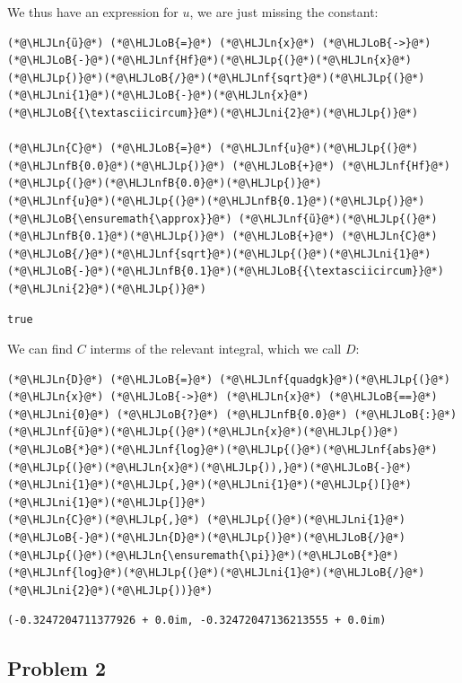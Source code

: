 \documentclass[12pt,a4paper]{article}
\newcommand{\HLJLn}[1]{#1}
\newcommand{\HLJLnf}[1]{\textcolor[RGB]{66,102,213}{#1}}
\newcommand{\HLJLnfB}[1]{\textcolor[RGB]{59,151,46}{#1}}
\newcommand{\HLJLni}[1]{\textcolor[RGB]{59,151,46}{#1}}
\newcommand{\HLJLoB}[1]{\textcolor[RGB]{102,102,102}{\textbf{#1}}}
\newcommand{\HLJLp}[1]{#1}
\begin{document}
We thus have an expression for $u$, we are just missing the constant:


\begin{lstlisting}
(*@\HLJLn{ũ}@*) (*@\HLJLoB{=}@*) (*@\HLJLn{x}@*) (*@\HLJLoB{->}@*) (*@\HLJLoB{-}@*)(*@\HLJLnf{Hf}@*)(*@\HLJLp{(}@*)(*@\HLJLn{x}@*)(*@\HLJLp{)}@*)(*@\HLJLoB{/}@*)(*@\HLJLnf{sqrt}@*)(*@\HLJLp{(}@*)(*@\HLJLni{1}@*)(*@\HLJLoB{-}@*)(*@\HLJLn{x}@*)(*@\HLJLoB{{\textasciicircum}}@*)(*@\HLJLni{2}@*)(*@\HLJLp{)}@*)

(*@\HLJLn{C}@*) (*@\HLJLoB{=}@*) (*@\HLJLnf{u}@*)(*@\HLJLp{(}@*)(*@\HLJLnfB{0.0}@*)(*@\HLJLp{)}@*) (*@\HLJLoB{+}@*) (*@\HLJLnf{Hf}@*)(*@\HLJLp{(}@*)(*@\HLJLnfB{0.0}@*)(*@\HLJLp{)}@*)
(*@\HLJLnf{u}@*)(*@\HLJLp{(}@*)(*@\HLJLnfB{0.1}@*)(*@\HLJLp{)}@*) (*@\HLJLoB{\ensuremath{\approx}}@*) (*@\HLJLnf{ũ}@*)(*@\HLJLp{(}@*)(*@\HLJLnfB{0.1}@*)(*@\HLJLp{)}@*) (*@\HLJLoB{+}@*) (*@\HLJLn{C}@*)(*@\HLJLoB{/}@*)(*@\HLJLnf{sqrt}@*)(*@\HLJLp{(}@*)(*@\HLJLni{1}@*)(*@\HLJLoB{-}@*)(*@\HLJLnfB{0.1}@*)(*@\HLJLoB{{\textasciicircum}}@*)(*@\HLJLni{2}@*)(*@\HLJLp{)}@*)
\end{lstlisting}

\begin{lstlisting}
true
\end{lstlisting}


We can find $C$ interms of the relevant integral, which we call $D$:


\begin{lstlisting}
(*@\HLJLn{D}@*) (*@\HLJLoB{=}@*) (*@\HLJLnf{quadgk}@*)(*@\HLJLp{(}@*)(*@\HLJLn{x}@*) (*@\HLJLoB{->}@*) (*@\HLJLn{x}@*) (*@\HLJLoB{==}@*) (*@\HLJLni{0}@*) (*@\HLJLoB{?}@*) (*@\HLJLnfB{0.0}@*) (*@\HLJLoB{:}@*) (*@\HLJLnf{ũ}@*)(*@\HLJLp{(}@*)(*@\HLJLn{x}@*)(*@\HLJLp{)}@*)(*@\HLJLoB{*}@*)(*@\HLJLnf{log}@*)(*@\HLJLp{(}@*)(*@\HLJLnf{abs}@*)(*@\HLJLp{(}@*)(*@\HLJLn{x}@*)(*@\HLJLp{)),}@*)(*@\HLJLoB{-}@*)(*@\HLJLni{1}@*)(*@\HLJLp{,}@*)(*@\HLJLni{1}@*)(*@\HLJLp{)[}@*)(*@\HLJLni{1}@*)(*@\HLJLp{]}@*)
(*@\HLJLn{C}@*)(*@\HLJLp{,}@*) (*@\HLJLp{(}@*)(*@\HLJLni{1}@*)(*@\HLJLoB{-}@*)(*@\HLJLn{D}@*)(*@\HLJLp{)}@*)(*@\HLJLoB{/}@*)(*@\HLJLp{(}@*)(*@\HLJLn{\ensuremath{\pi}}@*)(*@\HLJLoB{*}@*)(*@\HLJLnf{log}@*)(*@\HLJLp{(}@*)(*@\HLJLni{1}@*)(*@\HLJLoB{/}@*)(*@\HLJLni{2}@*)(*@\HLJLp{))}@*)
\end{lstlisting}

\begin{lstlisting}
(-0.3247204711377926 + 0.0im, -0.32472047136213555 + 0.0im)
\end{lstlisting}


\subsection{Problem 2}
\end{document}
